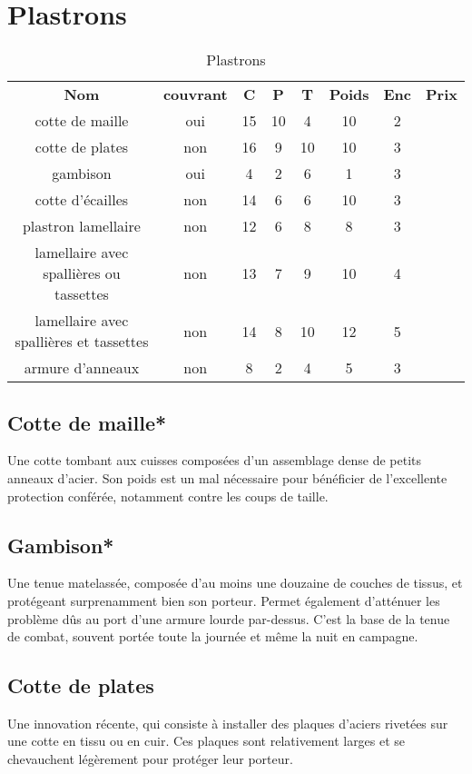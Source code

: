 \documentclass[10pt,a4paper,twocolumn]{book}
\begin{document}
\section{Plastrons}
\begin{table*}
\caption{Plastrons}
\label{tableplastrons}
\begin{tabular}{cccccccc}
\textbf{Nom}&\textbf{couvrant}&\textbf{C}&\textbf{P}&\textbf{T}&\textbf{Poids}&\textbf{Enc}&\textbf{Prix}\\
 cotte de maille & oui & 15 & 10 & 4 & 10 & 2 \\
 cotte de plates & non & 16 & 9 & 10 & 10 & 3 \\
 gambison & oui & 4 & 2 & 6 & 1 & 3 \\
 cotte d'écailles & non & 14 & 6 & 6 & 10 & 3 \\
 plastron lamellaire & non & 12 & 6 & 8 & 8 & 3 \\
 lamellaire avec spallières ou tassettes & non & 13 & 7 & 9 & 10 & 4 \\
 lamellaire avec spallières et tassettes & non & 14 & 8 & 10 & 12 & 5 \\
 armure d'anneaux & non & 8 & 2 & 4 & 5 &3 \\
\end{tabular}
\end{table*}
\subsection*{Cotte de maille*}
Une cotte tombant aux cuisses composées d'un assemblage dense de petits anneaux d'acier. Son poids est un mal nécessaire pour bénéficier de l'excellente protection conférée, notamment contre les coups de taille.
\subsection*{Gambison*}
Une tenue matelassée, composée d'au moins une douzaine de couches de tissus, et protégeant surprenamment bien son porteur. Permet également d'atténuer les problème dûs au port d'une armure lourde par-dessus. C'est la base de la tenue de combat, souvent portée toute la journée et même la nuit en campagne.
\subsection*{Cotte de plates}
Une innovation récente, qui consiste à installer des plaques d'aciers rivetées sur une cotte en tissu ou en cuir. Ces plaques sont relativement larges et se chevauchent légèrement pour protéger leur porteur.
\end{document}
